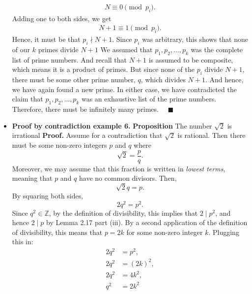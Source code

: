 \documentclass{report}
\begin{document}
\begin{itemize}
            \begin{align*}
                N \equiv 0 \pmod{p_{i}}
            .\end{align*}
            Adding one to both sides, we get
            \begin{align*}
                N+1 \equiv 1 \pmod{p_{i}}
            .\end{align*}
            Hence, it must be that $p_{i}\nmid N+1$. Since $p_{i}$ was arbitrary, this shows that none of our $k$ primes divide $N+1 $
            \bigbreak \noindent 
            We assumed that \( p_1, p_2, \ldots, p_k \) was the complete list of prime numbers. 
            And recall that \( N + 1 \) is assumed to be composite, which means it is a product of primes. 
            But since none of the \( p_i \) divide \( N + 1 \), there must be some other prime number, \( q \),
            which divides \( N + 1 \). And hence, we have again found a new prime.
            \bigbreak \noindent 
            In either case, we have contradicted the claim that \( p_1, p_2, \ldots, p_k \) was an exhaustive
            list of the prime numbers. Therefore, there must be infinitely many primes. $\quad \blacksquare $
        \item \textbf{Proof by contradiction example 6.}
            \bigbreak \noindent 
            \textbf{Proposition} The number $\sqrt{2}$ is irrational
            \bigbreak \noindent 
            \textbf{Proof.} Assume for a contradiction that $\sqrt{2}$ is rational. Then there must be some non-zero integers $p$ and $q$ where
            \[
                \sqrt{2} = \frac{p}{q}.
            \]
            Moreover, we may assume that this fraction is written in \textit{lowest terms}, meaning that $p$ and $q$ have no common divisors. Then,
            \[
                \sqrt{2}q = p.
            \]
            By squaring both sides,
            \[
                2q^2 = p^2.
            \]
            Since $q^2 \in \mathbb{Z}$, by the definition of divisibility, this implies that $2 \mid p^2$, and hence $2 \mid p$ by Lemma 2.17 part (iii). By a second application of the definition of divisibility, this means that $p = 2k$ for some non-zero integer $k$. Plugging this in:
            \begin{align*}
                2q^2 &= p^2,\\
                2q^2 &= (2k)^2,\\
                2q^2 &= 4k^2,\\
                q^2 &= 2k^2
            \end{align*}

\end{itemize}
\end{document}
